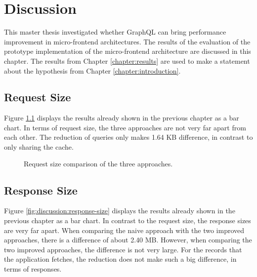\chapter{Discussion}\label{chapter:discussion}

This master thesis investigated whether GraphQL can bring performance improvement in micro-frontend architectures. The results of the evaluation of the prototype implementation of the micro-frontend architecture are discussed in this chapter. The results from Chapter \ref{chapter:results} are used to make a statement about the hypothesis from Chapter \ref{chapter:introduction}.


\section{Request Size}

Figure \ref{fig:discussion:request-size} displays the results already shown in the previous chapter as a bar chart. In terms of request size, the three approaches are not very far apart from each other. The reduction of queries only makes 1.64 KB difference, in contrast to only sharing the cache.

\begin{figure}[H]
  \centering
  \caption{Request size comparison of the three approaches.}\label{fig:discussion:request-size}
\end{figure}

\section{Response Size}

Figure \ref{fig:discussion:response-size} displays the results already shown in the previous chapter as a bar chart. In contrast to the request size, the response sizes are very far apart. When comparing the naive approach with the two improved approaches, there is a difference of about 2.40 MB. However, when comparing the two improved approaches, the difference is not very large. For the records that the application fetches, the reduction does not make such a big difference, in terms of responses.

